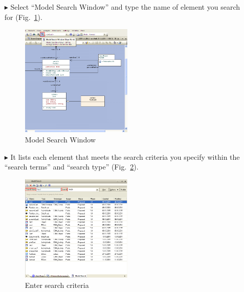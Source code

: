 \begin{enumerate}
\item[$\blacktriangleright$]Select ``Model Search Window'' and type the name of
element you search for (Fig.~\ref{fig_search01}). 
\begin{figure}[htbp]
\begin{center}
  \includegraphics[width=0.5\textwidth]{pics/tricks/search/search1}
  \caption{Model Search Window}  
  \label{fig_search01}
\end{center}
\end{figure}

\item[$\blacktriangleright$]It lists each element that meets the search criteria
you specify within the ``search terms'' and ``search type'' (Fig.~\ref{fig_search02}).
\begin{figure}[htbp]
\begin{center}
  \includegraphics[width=0.5\textwidth]{pics/tricks/search/search2}
  \caption{Enter search criteria}  
  \label{fig_search02}
\end{center}
\end{figure}


\end{enumerate}
